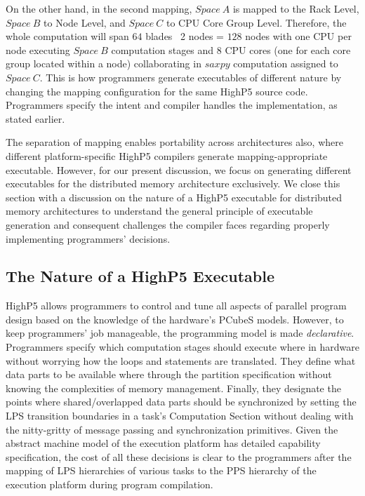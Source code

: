 \documentclass[ASNA,twocolumn]{USG} %
\begin{document}
{On the other hand, in the second mapping, $Space\ A$ is mapped to the Rack Level, $Space\ B$ to Node Level, and $Space\ C$ to CPU Core Group Level. Therefore, the whole computation will span $64$ blades \texttimes \ 2 nodes = $128$ nodes with one CPU per node executing $Space\ B$ computation stages and $8$ CPU cores (one for each core group located within a node) collaborating in $saxpy$ computation assigned to $Space\ C$. This is how programmers generate executables of different nature by changing the mapping configuration for the same HighP5 source code. Programmers specify the intent and compiler handles the implementation, as stated earlier. 

The separation of mapping enables portability across architectures also, where different platform-specific HighP5 compilers generate mapping-appropriate executable. However, for our present discussion, we focus on generating different executables for the distributed memory architecture exclusively. We close this section with a discussion on the nature of a HighP5 executable for distributed memory architectures to understand the general principle of executable generation and consequent challenges the compiler faces regarding properly implementing programmers' decisions.  

\subsection{The Nature of a HighP5 Executable}
\label{subsec:behave-exe}
HighP5 allows programmers to control and tune all aspects of parallel program design based on the knowledge of the hardware's PCubeS models. However, to keep programmers' job manageable, the programming model is made \textit{declarative}. Programmers specify which computation stages should execute where in hardware without worrying how the loops and statements are translated. They define what data parts to be available where through the partition specification without knowing the complexities of memory management. Finally, they designate the points where shared/overlapped data parts should be synchronized by setting the LPS transition boundaries in a task's Computation Section without dealing with the nitty-gritty of message passing and synchronization primitives. Given the abstract machine model of the execution platform has detailed capability specification, the cost of all these decisions is clear to the programmers after the mapping of LPS hierarchies of various tasks to the PPS hierarchy of the execution platform during program compilation.

}
\end{document}
